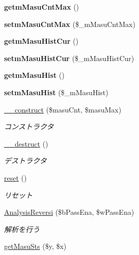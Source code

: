 \begin{DoxyCompactItemize}
{\bfseries getm\+Masu\+Cnt\+Max} ()
\item 
\mbox{\label{class_reversi_ae2dbd35c16269ab04a58aba0194f7faf}} 
{\bfseries setm\+Masu\+Cnt\+Max} (\$\+\_\+m\+Masu\+Cnt\+Max)
\item 
\mbox{\label{class_reversi_a577b674fea2b90470da3217b5390fe9c}} 
{\bfseries getm\+Masu\+Hist\+Cur} ()
\item 
\mbox{\label{class_reversi_a827554ef8aeb4c252bf4690c709ef762}} 
{\bfseries setm\+Masu\+Hist\+Cur} (\$\+\_\+m\+Masu\+Hist\+Cur)
\item 
\mbox{\label{class_reversi_a0eb2a30637500aef9245d2f82f68b769}} 
{\bfseries getm\+Masu\+Hist} ()
\item 
\mbox{\label{class_reversi_a26300550a0cc4f665b32426907b8ff0d}} 
{\bfseries setm\+Masu\+Hist} (\$\+\_\+m\+Masu\+Hist)
\item 
\hyperlink{class_reversi_a6667ca490c75777ec233f3ead04c5fd7}{\+\_\+\+\_\+construct} (\$masu\+Cnt, \$masu\+Max)
\begin{DoxyCompactList}\small\item\em コンストラクタ \end{DoxyCompactList}\item 
\hyperlink{class_reversi_a421831a265621325e1fdd19aace0c758}{\+\_\+\+\_\+destruct} ()
\begin{DoxyCompactList}\small\item\em デストラクタ \end{DoxyCompactList}\item 
\hyperlink{class_reversi_a4a20559544fdf4dcb457e258dc976cf8}{reset} ()
\begin{DoxyCompactList}\small\item\em リセット \end{DoxyCompactList}\item 
\hyperlink{class_reversi_ae15e49622562732d31d44a75a14c3b45}{Analysis\+Reversi} (\$b\+Pass\+Ena, \$w\+Pass\+Ena)
\begin{DoxyCompactList}\small\item\em 解析を行う \end{DoxyCompactList}\item 
\hyperlink{class_reversi_a1baed538e7a503cd51850d368b9e65f7}{get\+Masu\+Sts} (\$y, \$x)

\end{DoxyCompactItemize}
